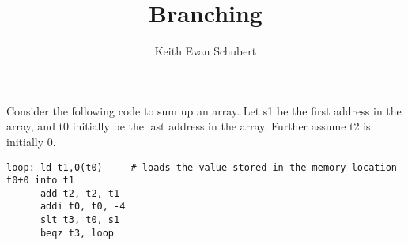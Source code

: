 \documentclass{article}
\title{Branching}
\author{Keith Evan Schubert}
\begin{document}
\maketitle

Consider the following code to sum up an array.  Let s1 be the first address in the array, and t0 initially be the last address in the array.  Further assume t2 is initially 0.

\begin{verbatim}
loop: ld t1,0(t0)     # loads the value stored in the memory location t0+0 into t1
      add t2, t2, t1  
      addi t0, t0, -4
      slt t3, t0, s1
      beqz t3, loop
\end{verbatim}
\end{document}
